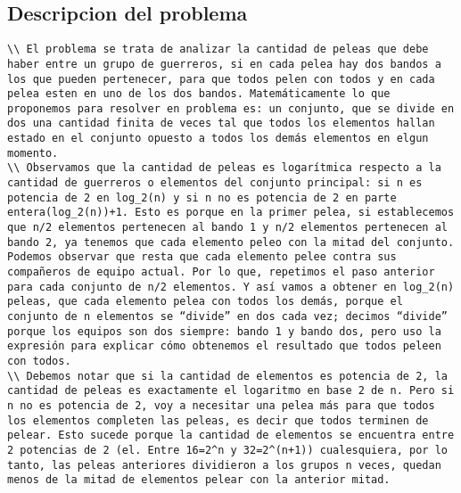\documentclass[10pt,a4paper]{article}
\begin{document}

\subtitle{Ejercicio 1:Kaio Ken}

\subsection{Descripcion del problema}

\begin{verbatim}
\\ El problema se trata de analizar la cantidad de peleas que debe haber entre un grupo de guerreros, si en cada pelea hay dos bandos a los que pueden pertenecer, para que todos pelen con todos y en cada pelea esten en uno de los dos bandos. Matemáticamente lo que proponemos para resolver en problema es: un conjunto, que se divide en dos una cantidad finita de veces tal que todos los elementos hallan estado en el conjunto opuesto a todos los demás elementos en elgun momento.
\\ Observamos que la cantidad de peleas es logarítmica respecto a la cantidad de guerreros o elementos del conjunto principal: si n es potencia de 2 en log_2(n) y si n no es potencia de 2 en parte entera(log_2(n))+1. Esto es porque en la primer pelea, si establecemos que n/2 elementos pertenecen al bando 1 y n/2 elementos pertenecen al bando 2, ya tenemos que cada elemento peleo con la mitad del conjunto. Podemos observar que resta que cada elemento pelee contra sus compañeros de equipo actual. Por lo que, repetimos el paso anterior para cada conjunto de n/2 elementos. Y así vamos a obtener en log_2(n) peleas, que cada elemento pelea con todos los demás, porque el conjunto de n elementos se “divide” en dos cada vez; decimos “divide” porque los equipos son dos siempre: bando 1 y bando dos, pero uso la expresión para explicar cómo obtenemos el resultado que todos peleen con todos. 
\\ Debemos notar que si la cantidad de elementos es potencia de 2, la cantidad de peleas es exactamente el logaritmo en base 2 de n. Pero si n no es potencia de 2, voy a necesitar una pelea más para que todos los elementos completen las peleas, es decir que todos terminen de pelear. Esto sucede porque la cantidad de elementos se encuentra entre 2 potencias de 2 (el. Entre 16=2^n y 32=2^(n+1)) cualesquiera, por lo tanto, las peleas anteriores dividieron a los grupos n veces, quedan menos de la mitad de elementos pelear con la anterior mitad. 
\end{verbatim}
\end{document}
